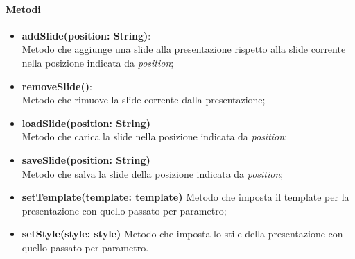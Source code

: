 	\paragraph{Metodi}
	\begin{itemize}
		\item \textbf{addSlide(position: String)}:\\
				Metodo che aggiunge una slide alla presentazione rispetto alla slide corrente nella posizione indicata da \textit{position};
		\item \textbf{removeSlide()}:\\
				Metodo che rimuove la slide corrente dalla presentazione;
		\item \textbf{loadSlide(position: String)}\\
				Metodo che carica la slide nella posizione indicata da \textit{position};
		\item \textbf{saveSlide(position: String)}\\
				Metodo che salva la slide della posizione indicata da \textit{position};
		\item \textbf{setTemplate(template: template)}
				Metodo che imposta il template per la presentazione con quello passato per parametro;
		\item \textbf{setStyle(style: style)}
				Metodo che imposta lo stile della presentazione con quello passato per parametro.
	\end{itemize}
